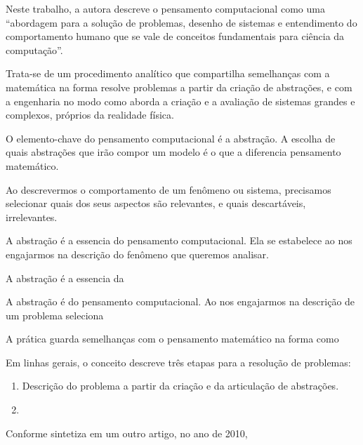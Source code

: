 Neste trabalho, a autora descreve o pensamento computacional como uma ``abordagem para a solução de problemas, desenho de sistemas e entendimento do comportamento humano que se vale de conceitos fundamentais para ciência da computação''. \cite[tradução nossa]{wing2006} 

Trata-se de um procedimento analítico que compartilha semelhanças com a matemática na forma resolve problemas a partir da criação de abstrações, e com a engenharia no modo como aborda a criação e a avaliação de sistemas grandes e complexos, próprios da realidade física. \cite[tradução nossa]{wing2008}

O elemento-chave do pensamento computacional é a abstração. A escolha de quais abstrações que irão compor um modelo é o que a diferencia pensamento matemático.



Ao descrevermos o comportamento de um fenômeno ou sistema, precisamos selecionar quais dos seus aspectos são relevantes, e quais descartáveis, irrelevantes. 



A abstração é a essencia do pensamento computacional. Ela se estabelece ao nos engajarmos na descrição do fenômeno que queremos analisar. 


A abstração é a essencia da 

A abstração é  do pensamento computacional. Ao nos engajarmos na descrição de um problema seleciona







A prática guarda semelhanças com o pensamento matemático na forma como


Em linhas gerais, o conceito descreve três etapas para a resolução de problemas:

\begin{enumerate}
  \item Descrição do problema a partir da criação e da articulação de abstrações.
  \item 

\end{enumerate}




Conforme sintetiza em um outro artigo, no ano de 2010,


